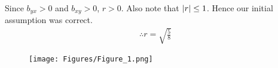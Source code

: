 \documentclass[journal,12pt,twocolumn]{IEEEtran}
\begin{document}
Since $b_{yx} > 0$ and $b_{xy} > 0$, $r > 0$. Also note that $\left\vert r\right\vert \le 1$. Hence our initial assumption was correct.
\begin{align}
  \therefore r = \sqrt{\frac{5}{8}}
\end{align}

\begin{figure}[!ht]
  \centering
  \texttt{[image: Figures/Figure\_1.png]}
  \label{Figure_1}
\end{figure}
\end{document}
